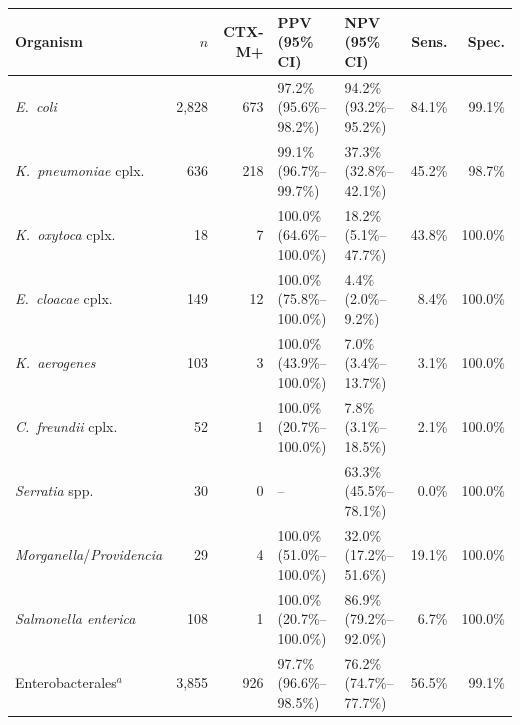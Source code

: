 \begin{tabular}{lrrllrr}
\hline\hline
Organism & $n$ & CTX-M+ & PPV (95\% CI) & NPV (95\% CI) & Sens. & Spec. \\
\hline
\textit{E.~coli} & 2{,}828 & 673 & 97.2\% (95.6\%--98.2\%) & 94.2\% (93.2\%--95.2\%) & 84.1\% & 99.1\% \\
\textit{K.~pneumoniae} cplx. & 636 & 218 & 99.1\% (96.7\%--99.7\%) & 37.3\% (32.8\%--42.1\%) & 45.2\% & 98.7\% \\
\textit{K.~oxytoca} cplx. & 18 & 7 & 100.0\% (64.6\%--100.0\%) & 18.2\% (5.1\%--47.7\%) & 43.8\% & 100.0\% \\
\textit{E.~cloacae} cplx. & 149 & 12 & 100.0\% (75.8\%--100.0\%) & 4.4\% (2.0\%--9.2\%) & 8.4\% & 100.0\% \\
\textit{K.~aerogenes} & 103 & 3 & 100.0\% (43.9\%--100.0\%) & 7.0\% (3.4\%--13.7\%) & 3.1\% & 100.0\% \\
\textit{C.~freundii} cplx. & 52 & 1 & 100.0\% (20.7\%--100.0\%) & 7.8\% (3.1\%--18.5\%) & 2.1\% & 100.0\% \\
\textit{Serratia} spp. & 30 & 0 & -- & 63.3\% (45.5\%--78.1\%) & 0.0\% & 100.0\% \\
\textit{Morganella}/\textit{Providencia} & 29 & 4 & 100.0\% (51.0\%--100.0\%) & 32.0\% (17.2\%--51.6\%) & 19.1\% & 100.0\% \\
\textit{Salmonella enterica} & 108 & 1 & 100.0\% (20.7\%--100.0\%) & 86.9\% (79.2\%--92.0\%) & 6.7\% & 100.0\% \\
Enterobacterales$^{a}$ & 3{,}855 & 926 & 97.7\% (96.6\%--98.5\%) & 76.2\% (74.7\%--77.7\%) & 56.5\% & 99.1\% \\
\hline\hline
\end{tabular}
